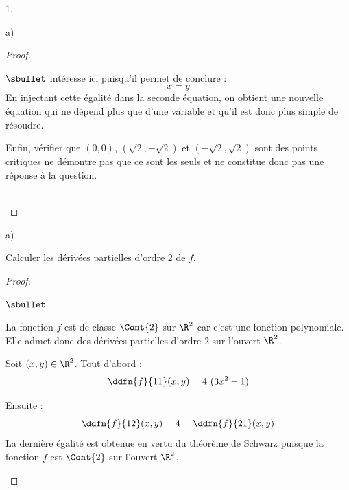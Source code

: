 \begin{noliste}{1.}
\begin{noliste}{a)}
\begin{proof}
\begin{remark}
\begin{noliste}{$\sbullet$}
          intéresse ici puisqu'il permet de conclure : 
          \[
          x = y
          \]
          En injectant cette égalité dans la seconde équation, on
          obtient une nouvelle équation qui ne dépend plus que d'une
          variable et qu'il est donc plus simple de résoudre.
        \item Enfin, vérifier que $(0,0)$, $(\sqrt{2}, -\sqrt{2})$ et
          $(-\sqrt{2}, \sqrt{2})$ sont des points critiques ne
          démontre pas que ce sont les seuls et ne constitue donc pas
          une réponse à la question.
        \end{noliste}
      \end{remark}~\\[-1.4cm]
    \end{proof}
  \end{noliste}


\newpage


\item
  \begin{noliste}{a)}
    \setlength{\itemsep}{2mm}
  \item Calculer les dérivées partielles d'ordre 2 de $f$.

    \begin{proof}~%
      \begin{noliste}{$\sbullet$}
      \item La fonction $f$ est de classe $\Cont{2}$ sur $\R^2$ car
        c'est une fonction polynomiale. \\
        Elle admet donc des dérivées partielles d'ordre $2$ sur
        l'ouvert $\R^2$. 

      \item Soit $(x, y) \in \R^2$. Tout d'abord :
        \[
        \ddfn{f}{11}(x, y) = 4 \ (3x^2 - 1) 
        \]

      \item Ensuite :
        \[
        \ddfn{f}{12}(x, y) = 4 = \ddfn{f}{21}(x, y)
        \]
        La dernière égalité est obtenue en vertu du théorème de
        Schwarz puisque la fonction $f$ est $\Cont{2}$ sur l'ouvert
        $\R^2$.
        

\end{noliste}
\end{proof}
\end{noliste}
\end{noliste}
